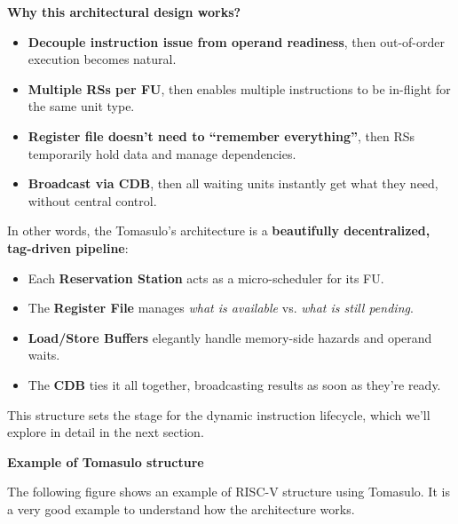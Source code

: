 \highspace
\begin{flushleft}
    \textcolor{Green3}{ \textbf{Why this architectural design works?}}
\end{flushleft}
\begin{itemize}
    \item \textbf{Decouple instruction issue from operand readiness}, then out-of-order execution becomes natural.
    \item \textbf{Multiple RSs per FU}, then enables multiple instructions to be in-flight for the same unit type.
    \item \textbf{Register file doesn't need to ``remember everything''}, then RSs temporarily hold data and manage dependencies.
    \item \textbf{Broadcast via CDB}, then all waiting units instantly get what they need, without central control.
\end{itemize}
In other words, the Tomasulo's architecture is a \textbf{beautifully decentralized, tag-driven pipeline}:
\begin{itemize}
    \item Each \textbf{Reservation Station} acts as a micro-scheduler for its FU.
    \item The \textbf{Register File} manages \emph{what is available} vs. \emph{what is still pending}.
    \item \textbf{Load/Store Buffers} elegantly handle memory-side hazards and operand waits.
    \item The \textbf{CDB} ties it all together, broadcasting results as soon as they're ready.
\end{itemize}
This structure sets the stage for the dynamic instruction lifecycle, which we'll explore in detail in the next section.

\newpage

\begin{flushleft}
    \textcolor{Green3}{ \textbf{Example of Tomasulo structure}}
\end{flushleft}
The following figure shows an example of RISC-V structure using Tomasulo. It is a very good example to understand how the architecture works.

